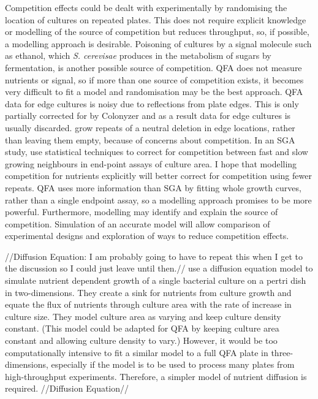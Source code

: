 Competition effects could be dealt with experimentally by randomising
the location of cultures on repeated plates. This does not require
explicit knowledge or modelling of the source of competition but
reduces throughput, so, if possible, a modelling approach is
desirable. Poisoning of cultures by a signal molecule such as ethanol,
which \textit{S. cerevisae} produces in the metabolism of sugars by
fermentation, is another possible source of competition. QFA does not
measure nutrients or signal, so if more than one source of competition
exists, it becomes very difficult to fit a model and randomisation may
be the best approach. QFA data for edge cultures is noisy due to
reflections from plate edges. This is only partially corrected for by
Colonyzer \citep{Lawless2010} and as a result data for edge cultures
is usually discarded. \citet{Addinall2011} grow repeats of a neutral
deletion in edge locations, rather than leaving them empty, because of
concerns about competition. In an SGA study, \citet{Baryshnikova2010}
use statistical techniques to correct for competition between fast and
slow growing neighbours in end-point assays of culture area. I hope
that modelling competition for nutrients explicitly will better
correct for competition using fewer repeats. QFA uses more information
than SGA by fitting whole growth curves, rather than a single endpoint
assay, so a modelling approach promises to be more
powerful. Furthermore, modelling may identify and explain the source
of competition. Simulation of an accurate model will allow comparison
of experimental designs and exploration of ways to reduce competition
effects.

//Diffusion Equation: I am probably going to have to repeat this
when I get to the discussion so I could just leave until then.//
\citet{Reo2014} use a diffusion equation model to simulate nutrient
dependent growth of a single bacterial culture on a pertri dish in
two-dimensions. They create a sink for nutrients from culture growth
and equate the flux of nutrients through culture area with the rate of
increase in culture size. They model culture area as varying and keep
culture density constant. (This model could be adapted for QFA by
keeping culture area constant and allowing culture density to vary.)
However, it would be too computationally intensive to fit a similar
model to a full QFA plate in three-dimensions, especially if the model
is to be used to process many plates from high-throughput
experiments. Therefore, a simpler model of nutrient diffusion is
required. //Diffusion Equation//


